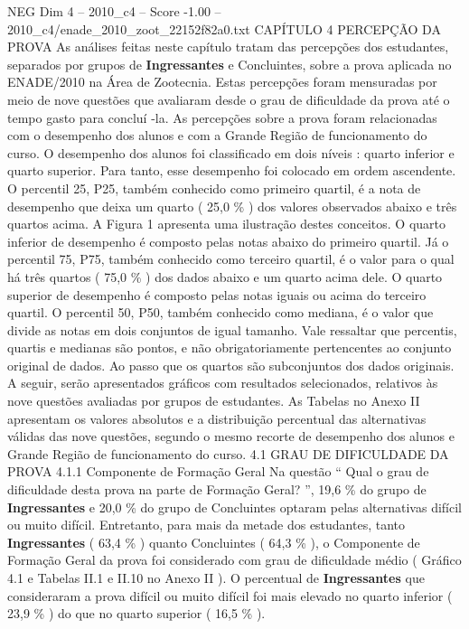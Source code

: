 \begin{textsample}{NEG Dim 4 – 2010\_c4 – Score -1.00 – 2010\_c4/enade\_2010\_zoot\_22152f82a0.txt}  \label{ex:f4_neg_061}
CAPÍTULO 4 PERCEPÇÃO DA PROVA As análises feitas neste capítulo tratam das percepções dos estudantes, separados por grupos de \textbf{Ingressantes} e Concluintes, sobre a prova aplicada no ENADE/2010 na Área de Zootecnia.
Estas percepções foram mensuradas por meio de nove questões que avaliaram desde o grau de dificuldade da prova até o tempo gasto para concluí -la.
As percepções sobre a prova foram relacionadas com o desempenho dos alunos e com a Grande Região de funcionamento do curso.
O desempenho dos alunos foi classificado em dois níveis : quarto inferior e quarto superior.
Para tanto, esse desempenho foi colocado em ordem ascendente.
O percentil 25, P25, também conhecido como primeiro quartil, é a nota de desempenho que deixa um quarto ( 25,0 \% ) dos valores observados abaixo e três quartos acima.
A Figura 1 apresenta uma ilustração destes conceitos.
O quarto inferior de desempenho é composto pelas notas abaixo do primeiro quartil.
Já o percentil 75, P75, também conhecido como terceiro quartil, é o valor para o qual há três quartos ( 75,0 \% ) dos dados abaixo e um quarto acima dele.
O quarto superior de desempenho é composto pelas notas iguais ou acima do terceiro quartil.
O percentil 50, P50, também conhecido como mediana, é o valor que divide as notas em dois conjuntos de igual tamanho.
Vale ressaltar que percentis, quartis e medianas são pontos, e não obrigatoriamente pertencentes ao conjunto original de dados.
Ao passo que os quartos são subconjuntos dos dados originais.
A seguir, serão apresentados gráficos com resultados selecionados, relativos às nove questões avaliadas por grupos de estudantes.
As Tabelas no Anexo II apresentam os valores absolutos e a distribuição percentual das alternativas válidas das nove questões, segundo o mesmo recorte de desempenho dos alunos e Grande Região de funcionamento do curso. 4.1 GRAU DE DIFICULDADE DA PROVA 4.1.1 Componente de Formação Geral Na questão “ Qual o grau de dificuldade desta prova na parte de Formação Geral? ”, 19,6 \% do grupo de \textbf{Ingressantes} e 20,0 \% do grupo de Concluintes optaram pelas alternativas difícil ou muito difícil.
Entretanto, para mais da metade dos estudantes, tanto \textbf{Ingressantes} ( 63,4 \% ) quanto Concluintes ( 64,3 \% ), o Componente de Formação Geral da prova foi considerado com grau de dificuldade médio ( Gráfico 4.1 e Tabelas II.1 e II.10 no Anexo II ).
O percentual de \textbf{Ingressantes} que consideraram a prova difícil ou muito difícil foi mais elevado no quarto inferior ( 23,9 \% ) do que no quarto superior ( 16,5 \% ).

\end{textsample}
